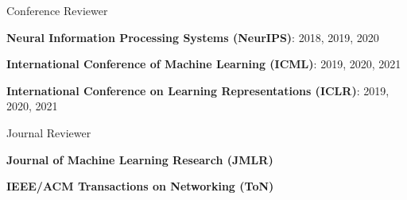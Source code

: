 

\begin{cventries}
  \cventryshortshort
    {Conference Reviewer}
    {
      \begin{cvitems}
        \item {\textbf{Neural Information Processing Systems (NeurIPS)}: 2018, 2019, 2020}
        \item {\textbf{International Conference of Machine Learning (ICML)}: 2019, 2020, 2021}
        \item {\textbf{International Conference on Learning Representations (ICLR)}: 2019, 2020, 2021}
      \end{cvitems}
    }
    \vspace{.1in}
    \cventryshortshort
    {Journal Reviewer}
    {
      \begin{cvitems}
        \item {\textbf{Journal of Machine Learning Research (JMLR)}}
        \item {\textbf{IEEE/ACM Transactions on Networking (ToN)}}
        \end{cvitems}
    }
\end{cventries}
